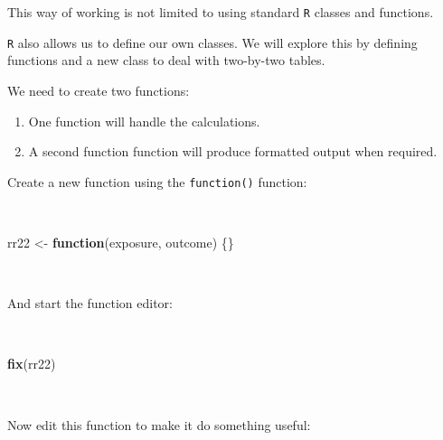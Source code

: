 \documentclass[12pt,a4paper]{book}
\newenvironment{Shaded}{\begin{snugshade}}{\end{snugshade}}
\newcommand{\ControlFlowTok}[1]{\textcolor[rgb]{0.13,0.29,0.53}{\textbf{#1}}}
\newcommand{\KeywordTok}[1]{\textcolor[rgb]{0.13,0.29,0.53}{\textbf{#1}}}
\newcommand{\NormalTok}[1]{#1}
\newcommand{\StringTok}[1]{\textcolor[rgb]{0.31,0.60,0.02}{#1}}
\theoremstyle{definition}
\theoremstyle{definition}
\theoremstyle{definition}
\theoremstyle{remark}
\begin{document}
This way of working is not limited to using standard \texttt{R} classes
and functions.

\texttt{R} also allows us to define our own classes. We will explore
this by defining functions and a new class to deal with two-by-two
tables.

We need to create two functions:

\begin{enumerate}
\def\labelenumi{\arabic{enumi}.}
\item
  One function will handle the calculations.
\item
  A second function function will produce formatted output when
  required.
\end{enumerate}

Create a new function using the \texttt{function()} function:

~

\begin{Shaded}
\begin{Highlighting}[]
\NormalTok{rr22 <-}\StringTok{ }\ControlFlowTok{function}\NormalTok{(exposure, outcome) \{\}}
\end{Highlighting}
\end{Shaded}

~

And start the function editor:

~

\begin{Shaded}
\begin{Highlighting}[]
\KeywordTok{fix}\NormalTok{(rr22)}
\end{Highlighting}
\end{Shaded}

~

Now edit this function to make it do something useful:

~
\end{document}
